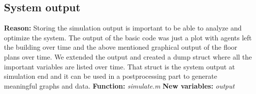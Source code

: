 \documentclass[11pt]{article}
\begin{document}

\subsection{System output}
\textbf{Reason:}
\newline
Storing the simulation output is important to be able to analyze and optimize the system. The output of the basic code was just a plot with agents left the building over time and the above mentioned graphical output of the floor plans over time. We extended the output and created a dump struct where all the important variables are listed over time. That struct is the system output at simulation end and it can be used in a postprocessing part to generate meaningful graphs and data.
\newline
\textbf{Function:}
\newline
\textit{simulate.m}
\newline
\textbf{New variables:}
\newline
\textit{output}
\newline
%
\end{document}
